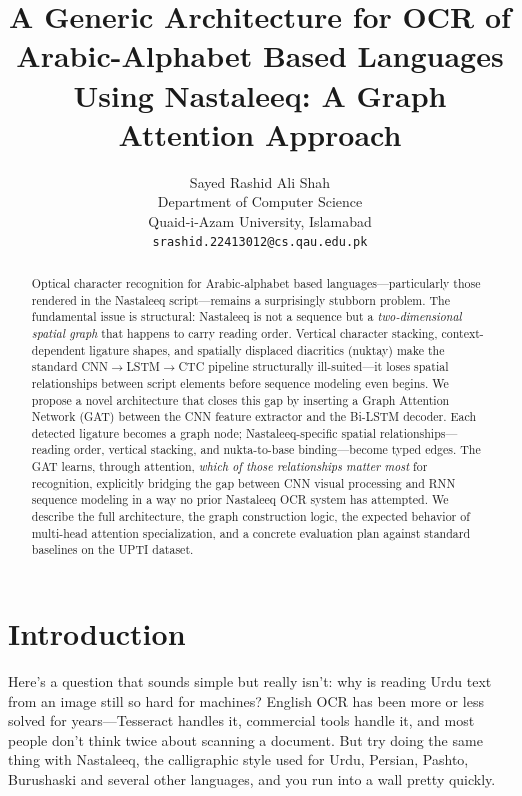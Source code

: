 \documentclass[11pt]{article}
\title{A Generic Architecture for OCR of Arabic-Alphabet Based Languages\\
Using Nastaleeq: A Graph Attention Approach}
\author{Sayed Rashid Ali Shah \\
  Department of Computer Science \\
  Quaid-i-Azam University, Islamabad \\
  \texttt{srashid.22413012@cs.qau.edu.pk}}
\begin{document}
\maketitle

\begin{abstract}
Optical character recognition for Arabic-alphabet based languages---particularly those
rendered in the Nastaleeq script---remains a surprisingly stubborn problem.
The fundamental issue is structural: Nastaleeq is not a sequence but a
\emph{two-dimensional spatial graph} that happens to carry reading order.
Vertical character stacking, context-dependent ligature shapes, and spatially displaced
diacritics (nuktay) make the standard CNN$\to$LSTM$\to$CTC pipeline structurally
ill-suited---it loses spatial relationships between script elements before sequence
modeling even begins.
We propose a novel architecture that closes this gap by inserting a Graph Attention
Network (GAT) between the CNN feature extractor and the Bi-LSTM decoder.
Each detected ligature becomes a graph node; Nastaleeq-specific spatial
relationships---reading order, vertical stacking, and nukta-to-base binding---become
typed edges.
The GAT learns, through attention, \emph{which of those relationships matter most} for
recognition, explicitly bridging the gap between CNN visual processing and RNN sequence
modeling in a way no prior Nastaleeq OCR system has attempted.
We describe the full architecture, the graph construction logic, the expected behavior of
multi-head attention specialization, and a concrete evaluation plan against standard
baselines on the UPTI dataset.
\end{abstract}

\section{Introduction}

Here's a question that sounds simple but really isn't: why is reading Urdu text from an
image still so hard for machines?
English OCR has been more or less solved for years---Tesseract \citep{Smith2007} handles it, commercial
tools handle it, and most people don't think twice about scanning a document.
But try doing the same thing with Nastaleeq, the calligraphic style used for Urdu,
Persian, Pashto, Burushaski and several other languages, and you run into a wall pretty quickly.
\end{document}
